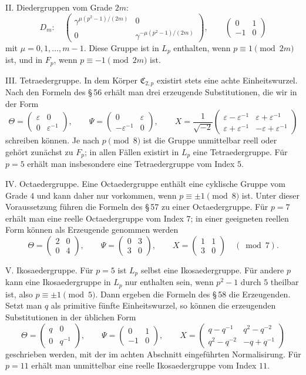 \documentclass[11pt]{article}
\providecommand{\mat}[4]{\begin{pmatrix}#1&#2\\#3&#4\end{pmatrix}}
\providecommand{\mat}[4]{\begin{pmatrix}#1&#2\\#3&#4\end{pmatrix}}
\providecommand{\Cfield}{\mathfrak C}
\providecommand{\mat}[1]{\begin{pmatrix}#1\end{pmatrix}}
\begin{document}
II. Diedergruppen vom Grade $2m$:
\begin{equation}
 D_m:\quad
 \mat{\gamma^{\mu(p^2-1)/(2m)}}{0}{0}{\gamma^{-\mu(p^2-1)/(2m)}},
 \qquad
 \mat{0}{1}{-1}{0}
 \tag{5}
\end{equation}
mit $\mu=0,1,\ldots,m-1$. Diese Gruppe ist in $L_p$ enthalten, wenn $p\equiv1\pmod {2m}$ ist, und in $F_p$, wenn $p\equiv-1\pmod {2m}$ ist.

III. Tetraedergruppe. In dem Körper $\Cfield_{2,p}$ existirt stets eine achte Einheitswurzel. Nach den Formeln des \S\,56 erhält man drei erzeugende Substitutionen, die wir in der Form
\begin{equation}
 \Theta=\mat{\varepsilon}{0}{0}{\varepsilon^{-1}},\qquad
 \Psi=\mat{0}{\varepsilon}{-\varepsilon^{-1}}{0},\qquad
 X=\frac{1}{\sqrt{-2}}\mat{\varepsilon-\varepsilon^{-1}}{\varepsilon+\varepsilon^{-1}}{\varepsilon+\varepsilon^{-1}}{-\varepsilon+\varepsilon^{-1}}
 \tag{6}
\end{equation}
schreiben können. Je nach $p\pmod 8$ ist die Gruppe unmittelbar reell oder gehört zunächst zu $F_p$; in allen Fällen existirt in $L_p$ eine Tetraedergruppe. Für $p=5$ erhält man insbesondere eine Tetraedergruppe vom Index $5$.

IV. Octaedergruppe. Eine Octaedergruppe enthält eine cyklische Gruppe vom Grade $4$ und kann daher nur vorkommen, wenn $p\equiv\pm1\pmod8$ ist. Unter dieser Voraussetzung führen die Formeln des \S\,57 zu einer Octaedergruppe. Für $p=7$ erhält man eine reelle Octaedergruppe vom Index $7$; in einer geeigneten reellen Form können als Erzeugende genommen werden
\begin{equation}
 \Theta=\mat{2}{0}{0}{4},\qquad
 \Psi=\mat{0}{3}{3}{0},\qquad
 X=\mat{1}{1}{3}{0}
 \quad (\bmod 7).
 \tag{7}
\end{equation}

V. Ikosaedergruppe. Für $p=5$ ist $L_p$ selbst eine Ikosaedergruppe. Für andere $p$ kann eine Ikosaedergruppe in $L_p$ nur enthalten sein, wenn $p^2-1$ durch $5$ theilbar ist, also $p\equiv\pm1\pmod5$. Dann ergeben die Formeln des \S\,58 die Erzeugenden. Setzt man $q$ als primitive fünfte Einheitswurzel, so können die erzeugenden Substitutionen in der üblichen Form
\begin{equation}
 \Theta=\mat{q}{0}{0}{q^{-1}},\qquad
 \Psi=\mat{0}{1}{-1}{0},\qquad
 X=\mat{q-q^{-1}}{q^2-q^{-2}}{q^2-q^{-2}}{-q+q^{-1}}
 \tag{8}
\end{equation}
geschrieben werden, mit der im achten Abschnitt eingeführten Normalisirung. Für $p=11$ erhält man unmittelbar eine reelle Ikosaedergruppe vom Index $11$.
\end{document}
